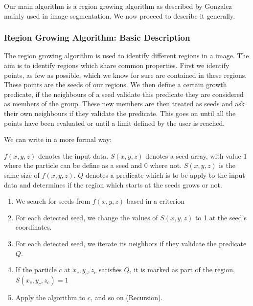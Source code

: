 \documentclass[12pt]{article}
\begin{document}
Our main algorithm is a region growing algorithm
 as described by Gonzalez
  \cite{gonzalez_digital_2008} mainly used in
   image segmentation. We now proceed to describe
    it generally.
\subsubsection{Region Growing Algorithm: Basic Description}

\begin{par}
The region growing algorithm is used to identify different regions in a image. The aim is to identify regions which share common properties. First we identify points, as few as possible, which we know for sure are contained in these regions. These points are the seeds of our regions. We then define a certain growth predicate, if the neighbours of a seed validate this predicate they are considered as members of the group. These new members are then treated as seeds and ask their own neighbours if they validate the predicate. This goes on until all the points have been evaluated or until a limit defined by the user is reached.
\end{par}

\begin{par}
We can write in a more formal way:
\end{par}

\begin{par}
$f(x,y,z)$ denotes the input data. $S(x,y,z)$ denotes a seed array, with
value 1 where the particle can be define as a seed and 0 where not. $S(x,y,z)$ is the
same size of $f(x,y,z)$. $Q$ denotes a predicate which is to be apply to the
input data and determines if the region which
 starts at the seeds grows or
not. 
\end{par}

\begin{enumerate}
	\item We search for seeds from $f(x,y,z)$ based in a criterion
	\item For each detected seed, we change the values of $S(x,y,z)$ to 1 at the seed's coordinates.
	\item For each detected seed, we iterate its neighbors if they validate the predicate $Q$.
    \item If the particle $c$ at $x_c, y_c, z_c$ satisfies $Q$, it is marked as part of the region, $S(x_c, y_c, z_c) = 1$
    \item Apply the algorithm to $c$, and so on
     (Recursion).
\end{enumerate}
\end{document}
